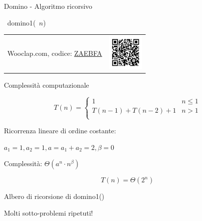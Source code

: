 \begin{frame}[fragile]{Domino - Algoritmo ricorsivo}

\vspace{-9pt}
\begin{Procedure}
\caption[A]{\INTEGER\ \textsf{domino1}(\INTEGER\ $n$)}
\end{Procedure}

\begin{center}
\begin{tabular}{m{7cm}m{3cm}}
Wooclap.com, codice: \href{https://app.wooclap.com/ZAEBFA}{\alert{\underline{ZAEBFA}}}
&
\includegraphics[width=1.8cm]{qrcode-13-pd1.png}\\
\end{tabular}
\end{center}


\end{frame}

\begin{frame}{Complessità computazionale}

\vspace{-9pt}

\[
  T(n) = \begin{cases}
  1 & n \leq 1 \\
  T(n-1)+T(n-2)+1 & n > 1\\
  \end{cases}
\]

\pause
Ricorrenza lineare di ordine costante:
\BI
\item $a_1 = 1, a_2=1, a= a_1+a_2 = 2, \beta=0$
\item Complessità: $\Theta(a^n \cdot n^\beta)$
\EI

\[
T(n) = \Theta(2^n)
\]

\end{frame}

\begin{frame}{Albero di ricorsione di \textsf{domino1()}}
  

\vspace{-12pt}
\begin{flushright}
Molti sotto-problemi ripetuti!
\end{flushright}
\end{frame}

